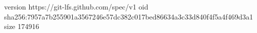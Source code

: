 version https://git-lfs.github.com/spec/v1
oid sha256:7957a7b255901a3567246e57dc382c017bed86634a3c33d840f4f5a4f469d3a1
size 174916
